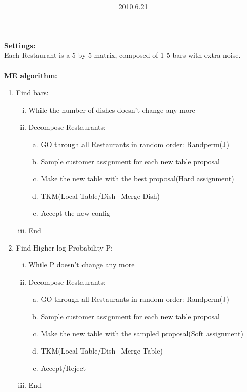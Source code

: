 \documentclass{article}
\title{\vspace{0.3in}\textmd{\textbf{\hmwkTitle}}}
\date{2010.6.21}
\author{\textbf{\hmwkAuthorName}}
\begin{document}
\begin{spacing}{1.1}
\maketitle
{\bf Settings:}\\
Each Restaurant is a 5 by 5 matrix, composed of 1-5 bars with extra noise.\\ \\
{\bf ME algorithm:}\\
\begin{enumerate}[(1)]
\item Find bars:
\begin{enumerate}[(i)]
\item While the number of dishes doesn't change any more
\item Decompose Restaurants:
\begin{enumerate}[(a)]
\item GO through all Restaurants in random order: Randperm(J)
\item Sample customer assignment for each new table proposal
\item Make the new table with the best proposal(Hard assignment)
\item TKM(Local Table/Dish+Merge Dish)
\item Accept the new config
\end{enumerate}
\item End
\end{enumerate}
\item Find Higher log Probability P:
\begin{enumerate}[(i)]
\item While P doesn't change any more
\item Decompose Restaurants:
\begin{enumerate}[(a)]
\item GO through all Restaurants in random order: Randperm(J)
\item Sample customer assignment for each new table proposal
\item Make the new table with the sampled proposal(Soft assignment)
\item TKM(Local Table/Dish+Merge Table)
\item Accept/Reject
\end{enumerate}
\item End
\end{enumerate}
\end{enumerate}




\end{spacing}
\end{document}
